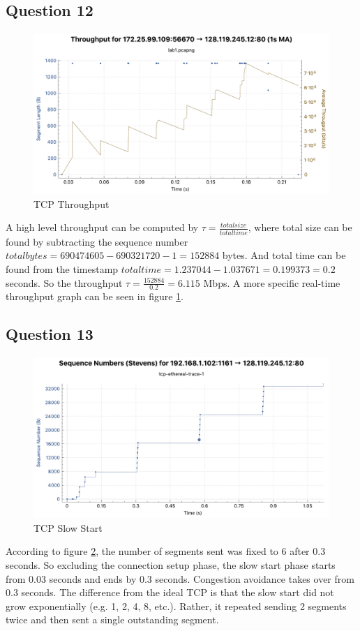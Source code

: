 \documentclass[titlepage, paper=a4, fontsize=11pt]{scrartcl} %
\numberwithin{equation}{section} %
\numberwithin{figure}{section} %
\numberwithin{table}{section} %
\begin{document}
\subsection*{Question 12}
\begin{figure}[!ht]
    \centering
    \includegraphics[width=\textwidth]{images/lab1-q12.pdf}
    \caption{TCP Throughput}
    \label{fig:tcp-thru}
\end{figure}
A high level throughput can be computed by $\tau = \frac{total size}{total time}$, where total size can be found by subtracting the sequence number $total bytes = 690474605-690321720-1=152884$ bytes. And total time can be found from the timestamp $total time = 1.237044 - 1.037671 = 0.199373 = 0.2$ seconds. So the throughput $\tau = \frac{152884}{0.2}=6.115$ Mbps. A more specific real-time throughput graph can be seen in figure \ref{fig:tcp-thru}. \\

\subsection*{Question 13}
\begin{figure}[!ht]
    \centering
    \includegraphics[width=\textwidth]{images/lab1-q13.pdf}
    \caption{TCP Slow Start}
    \label{fig:tcp-ss}
\end{figure}
According to figure \ref{fig:tcp-ss}, the number of segments sent was fixed to 6 after 0.3 seconds. So excluding the connection setup phase, the slow start phase starts from 0.03 seconds and ends by 0.3 seconds. Congestion avoidance takes over from 0.3 seconds. The difference from the ideal TCP is that the slow start did not grow exponentially (e.g. 1, 2, 4, 8, etc.). Rather, it repeated sending 2 segments twice and then sent a single outstanding segment. \\
\end{document}
